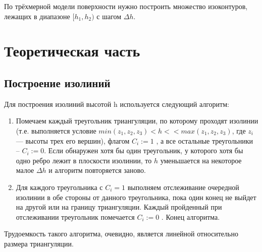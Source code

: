 \documentclass[12pt,a4paper,oneside]{extarticle}
\begin{document}
    По трёхмерной модели поверхности нужно построить множество изоконтуров, лежащих в диапазоне $[h_1, h_2)$ с шагом $\Delta h$.

\section{Теоретическая часть}
    \subsection{Построение изолиний}
        Для построения изолиний высотой h используется следующий алгоритм:

        \begin{enumerate}
            \item Помечаем каждый треугольник триангуляции, по которому проходят изолинии (т.е. выполняется условие $min( z_1, z_2, z_3 ) < h < < max( z_1, z_2, z_3 )$, где $z_i$ --- высоты трех его вершин), флагом $C_i := 1$ , а все остальные треугольники – $C_i := 0$. Если обнаружен хотя бы один треугольник, у которого хотя бы одно ребро лежит в плоскости изолинии, то $h$ уменьшается на некоторое малое $\Delta h$ и алгоритм повторяется заново.
            \item  Для каждого треугольника с $C_i = 1$ выполняем отслеживание очередной изолинии в обе стороны от данного треугольника, пока один конец не выйдет на другой или на границу триангуляции. Каждый пройденный при отслеживании треугольник помечается $C_i := 0$ . Конец алгоритма.
        \end{enumerate}

        Трудоемкость такого алгоритма, очевидно, является линейной относительно размера триангуляции.
\end{document}

